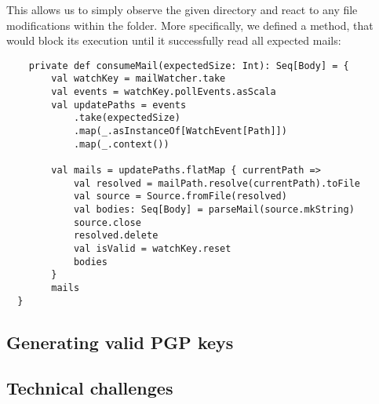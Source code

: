 This allows us to simply observe the given directory and react to any file modifications within the folder.
More specifically, we defined a method, that would block its execution until it successfully read all expected mails: 
\begin{verbatim}
    private def consumeMail(expectedSize: Int): Seq[Body] = {
        val watchKey = mailWatcher.take
        val events = watchKey.pollEvents.asScala
        val updatePaths = events
            .take(expectedSize)
            .map(_.asInstanceOf[WatchEvent[Path]])
            .map(_.context())

        val mails = updatePaths.flatMap { currentPath =>
            val resolved = mailPath.resolve(currentPath).toFile
            val source = Source.fromFile(resolved)
            val bodies: Seq[Body] = parseMail(source.mkString)
            source.close
            resolved.delete
            val isValid = watchKey.reset
            bodies
        }
        mails
  }
\end{verbatim}

\subsection{Generating valid PGP keys}
\newpage
\subsection{Technical challenges}
\newpage